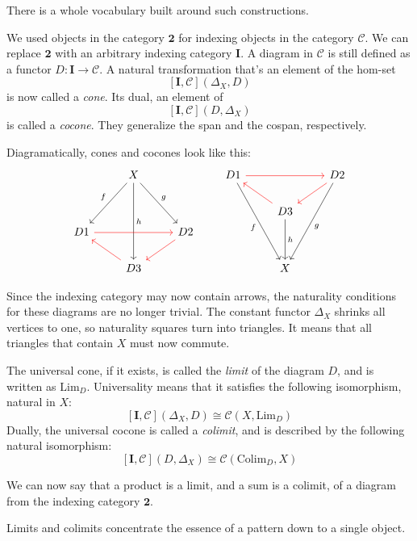 \documentclass[DaoFP]{subfiles}
\begin{document}
There is a whole vocabulary built around such constructions. 

We used objects in the category $\mathbf{2}$ for indexing objects in the category $\mathcal{C}$. We can replace $\mathbf{2}$ with an arbitrary indexing category $\mathbf{I}$. A diagram in $\mathcal{C}$ is still defined as a functor $D \colon \mathbf{I} \to \mathcal{C}$. A  natural transformation that's an element of the hom-set
\[ [\mathbf{I}, \mathcal{C}](\Delta_X, D)  \]
is now called a \emph{cone}. Its dual, an element of
\[ [\mathbf{I}, \mathcal{C}](D, \Delta_X)  \]
is called a \emph{cocone}. They generalize the span and the cospan, respectively.

Diagramatically, cones and cocones look like this:
\[
 \begin{tikzcd}
  & X
\arrow[ddr, "g"]
 \arrow[ddl, "f"']
 \arrow[ddd, "h"]
 \\
\\
D 1 
\arrow[rr, red]
&& D 2
\arrow[dl, red]
\\
& D 3
\arrow[ul, red]
 \end{tikzcd}
 \qquad
\begin{tikzcd}
 D 1
 \arrow[rr, red]
 \arrow[dddr, "f"']
 && D 2
\arrow[dl, red]
 \arrow[dddl, "g"]
 \\
 & D 3
 \arrow[ul, red]
 \arrow[dd, "h"]
 \\
 \\
 & X
 \end{tikzcd}
 \]

Since the indexing category may now contain arrows, the naturality conditions for these diagrams are no longer trivial. The constant functor $\Delta_X$ shrinks all vertices to one, so naturality squares turn into triangles. It means that all triangles that contain $X$ must now commute. 

The universal cone, if it exists, is called the \emph{limit} of the diagram $D$, and is written as $\text{Lim}_D$. Universality means that it satisfies the following isomorphism, natural in $X$:
\[ [\mathbf{I}, \mathcal{C}](\Delta_X, D)  \cong \mathcal{C}(X, \text{Lim}_D) \]
Dually, the universal cocone is called a \emph{colimit}, and is described by the following natural isomorphism:
\[ [\mathbf{I}, \mathcal{C}](D, \Delta_X)  \cong \mathcal{C}( \text{Colim}_D, X) \]

We can now say that a product is a limit, and a sum is a colimit, of a diagram from the indexing category $\mathbf{2}$.

Limits and colimits concentrate the essence of a pattern down to a single object. 
\end{document}
